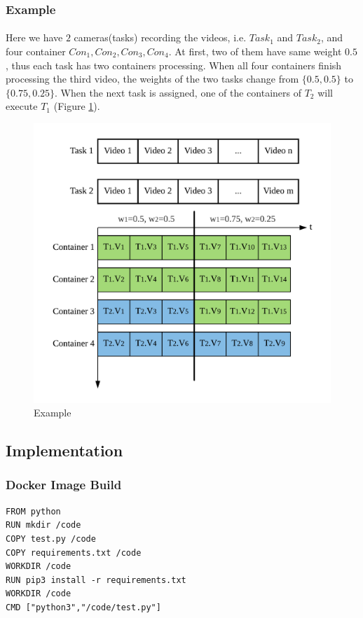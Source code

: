 \documentclass{article}
\begin{document}
            \subsubsection{Example}
                \paragraph{}
                Here we have $2$ cameras(tasks) recording the videos, i.e. $Task_1$ and $Task_2$, and four container $Con_1,Con_2,Con_3,Con_4$. At first, two of them have same weight $0.5$, thus each task has two containers processing. When all four containers finish processing the third video, the weights of the two tasks change from $\{0.5,0.5\}$ to $\{0.75,0.25\}$. When the next task is assigned, one of the containers of $T_2$ will execute $T_1$ (Figure \ref{img4}).
            \begin{figure}[H]
                \centering
                \includegraphics[width=.8\textwidth]{img/report4.png}
                \caption{Example}
                \label{img4} 
            \end{figure}
        \newpage
        \subsection{Implementation}
            \subsubsection{Docker Image Build}
                    \begin{lstlisting}
FROM python
RUN mkdir /code
COPY test.py /code
COPY requirements.txt /code
WORKDIR /code
RUN pip3 install -r requirements.txt
WORKDIR /code
CMD ["python3","/code/test.py"]
                    \end{lstlisting}
\end{document}
